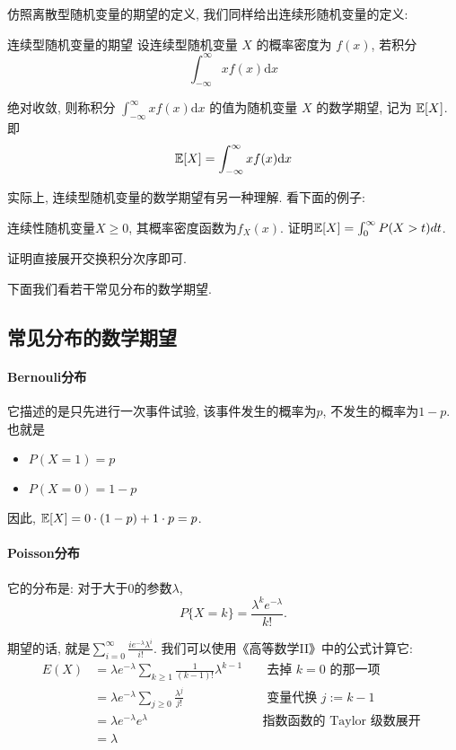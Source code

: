     
    仿照离散型随机变量的期望的定义, 我们同样给出连续形随机变量的定义:
    \begin{definition}{连续型随机变量的期望}
        设连续型随机变量 $X$ 的概率密度为 $f(x)$, 若积分
$$
\int_{-\infty}^{\infty} x f(x) \mathrm{d} x
$$

绝对收敛, 则称积分 $\int_{-\infty}^{\infty} x f(x) \mathrm{d} x$ 的值为随机变量 $X$ 的数学期望, 记为 $\mathbb E[X]$.即
$$
\mathbb E[X]=\int_{-\infty}^{\infty} x f(x) \mathrm{d} x
$$
    \end{definition}

    实际上, 连续型随机变量的数学期望有另一种理解. 看下面的例子: 
    \begin{example}
        \label{eg:expectation-calc}
        连续性随机变量$X\geq 0$, 其概率密度函数为$f_X(x)$. 证明$\mathbb E[X]=\int_0^\infty P(X>t) dt$. 
    \end{example}

    证明直接展开交换积分次序即可. 
    
    下面我们看若干常见分布的数学期望. 

    \subsection{常见分布的数学期望}

    \paragraph{Bernouli分布} 它描述的是只先进行一次事件试验, 该事件发生的概率为$p$, 不发生的概率为$1-p$. 也就是
    \begin{itemize}
        \item $P(X=1)=p$
        \item $P(X=0)=1-p$
    \end{itemize}

    因此, $ \mathbb E[X]=0 \cdot(1-p)+1 \cdot p=p$.

    \paragraph{Poisson分布} 它的分布是: 对于大于0的参数$\lambda$, $$
    P\{X=k\}=\frac{\lambda^k e^{-\lambda}}{k !}. 
    $$    

    期望的话, 就是$\sum_{i=0}^{\infty} \frac{i e^{-\lambda} \lambda^i}{i !}$. 我们可以使用《高等数学II》中的公式计算它: 
    $$
\begin{aligned}
{E}(X) & =\lambda e^{-\lambda} \sum_{k \geq 1} \frac{1}{(k-1) !} \lambda^{k-1} & & \text { 去掉 } k=0 \text { 的那一项 } \\
& =\lambda e^{-\lambda} \sum_{j \geq 0} \frac{\lambda^j}{j !} & & \text { 变量代换 } j:=k-1 \\
& =\lambda e^{-\lambda} e^\lambda & & \text {指数函数的 Taylor 级数展开 } \\
& =\lambda & &
\end{aligned}
$$

